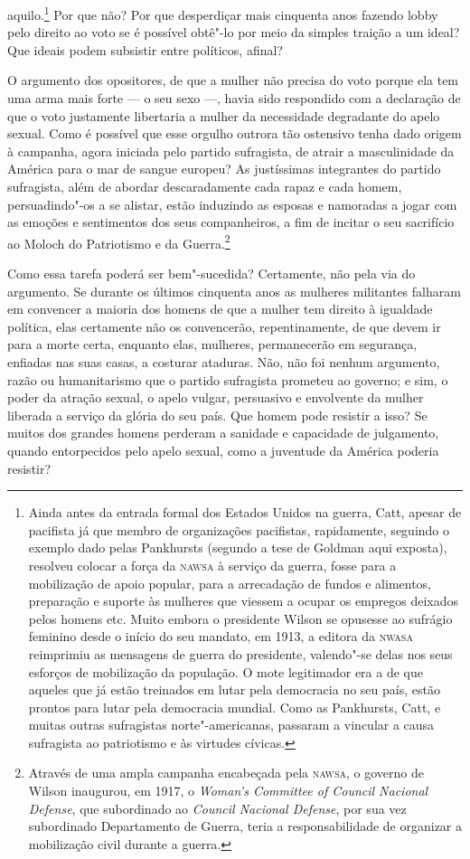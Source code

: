 aquilo.\footnote{Ainda antes da entrada formal dos Estados Unidos na
  guerra, Catt, apesar de pacifista já que membro de organizações pacifistas,
  rapidamente, seguindo o exemplo dado pelas Pankhursts (segundo a tese
  de Goldman aqui exposta), resolveu colocar a força da \textsc{nawsa} à
  serviço da guerra, fosse para a mobilização de apoio popular, para a
  arrecadação de fundos e alimentos, preparação e suporte às mulheres
  que viessem a ocupar os empregos deixados pelos homens etc. Muito
  embora o presidente Wilson se opusesse ao sufrágio feminino desde o
  início do seu mandato, em 1913, a editora da \textsc{nwasa} reimprimiu as
  mensagens de guerra do presidente, valendo"-se delas nos seus esforços
  de mobilização da população. O mote legitimador era a de que aqueles
  que já estão treinados em lutar pela democracia no seu país, estão
  prontos para lutar pela democracia mundial. Como as Pankhursts, Catt,
  e muitas outras sufragistas norte"-americanas, passaram a vincular a
  causa sufragista ao patriotismo e às virtudes cívicas.} Por que não?
Por que desperdiçar mais cinquenta anos fazendo lobby pelo direito ao
voto se é possível obtê"-lo por meio da simples traição a um ideal? Que
ideais podem subsistir entre políticos, afinal?

O argumento dos opositores, de que a mulher não precisa do voto porque
ela tem uma arma mais forte --- o seu sexo ---, havia sido respondido com
a declaração de que o voto justamente libertaria a mulher da necessidade
degradante do apelo sexual. Como é possível que esse orgulho outrora tão ostensivo
tenha dado origem à campanha, agora iniciada pelo partido sufragista, de
atrair a masculinidade da América para o mar de sangue europeu? As
justíssimas integrantes do partido sufragista, além de abordar
descaradamente cada rapaz e cada homem, persuadindo"-os a se alistar,
estão induzindo as esposas e namoradas a jogar com as emoções e
sentimentos dos seus companheiros, a fim de incitar o seu sacrifício ao
Moloch do Patriotismo e da Guerra.\footnote{Através de uma ampla
  campanha encabeçada pela \textsc{nawsa}, o governo de Wilson inaugurou, em
  1917, o \emph{Woman's Committee of Council Nacional Defense}, que
  subordinado ao \emph{Council Nacional Defense}, por sua vez
  subordinado Departamento de Guerra, teria a responsabilidade de
  organizar a mobilização civil durante a guerra.}

Como essa tarefa poderá ser bem"-sucedida? Certamente, não pela via do
argumento. Se durante os últimos cinquenta anos as mulheres militantes
falharam em convencer a maioria dos homens de que a mulher tem direito
à igualdade política, elas certamente não os convencerão,
repentinamente, de que devem ir para a morte certa, enquanto elas,
mulheres, permanecerão em segurança, enfiadas nas suas casas, a costurar
ataduras. Não, não foi nenhum argumento, razão ou humanitarismo que o\label{argumento}
partido sufragista prometeu ao governo; e sim, o poder da atração
sexual, o apelo vulgar, persuasivo e envolvente da mulher liberada a
serviço da glória do seu país. Que homem pode resistir a isso? Se muitos
dos grandes homens perderam a sanidade e capacidade de julgamento,
quando entorpecidos pelo apelo sexual, como a juventude da América
poderia resistir?

